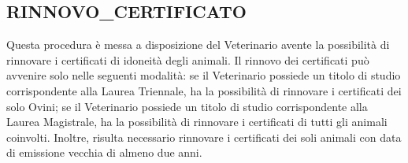 \documentclass[12pt]{report}
\begin{document}
\subsection*{RINNOVO\_CERTIFICATO}
Questa procedura è messa a disposizione del Veterinario avente la possibilità di rinnovare i certificati di idoneità degli animali. Il rinnovo dei certificati può avvenire solo nelle seguenti modalità: se il Veterinario possiede un titolo di studio corrispondente alla Laurea Triennale, ha la possibilità di rinnovare i certificati dei solo Ovini; se il Veterinario possiede un titolo di studio corrispondente alla Laurea Magistrale, ha la possibilità di rinnovare i certificati di tutti gli animali coinvolti. Inoltre, risulta necessario rinnovare i certificati dei soli animali con data di emissione vecchia di almeno due anni. 
\end{document}
